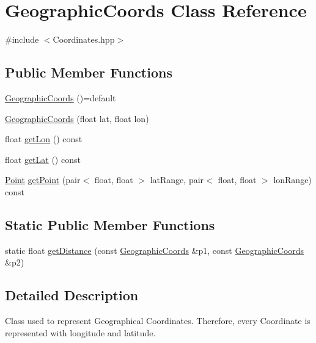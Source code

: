 \hypertarget{class_geographic_coords}{}\section{Geographic\+Coords Class Reference}
\label{class_geographic_coords}


{\ttfamily \#include $<$Coordinates.\+hpp$>$}

\subsection*{Public Member Functions}
\begin{DoxyCompactItemize}
\item 
\hyperlink{class_geographic_coords_a6e58da78d507551dc7a6c39e6ffb33b3}{Geographic\+Coords} ()=default
\item 
\hyperlink{class_geographic_coords_a5db8168e8754a1eb2d13e3d2c8318cb4}{Geographic\+Coords} (float lat, float lon)
\item 
float \hyperlink{class_geographic_coords_a4e59f2e3ea261e73c33014368770ad21}{get\+Lon} () const
\item 
float \hyperlink{class_geographic_coords_ab2fa1d7cde50be2a00c297caa302297a}{get\+Lat} () const
\item 
\hyperlink{class_point}{Point} \hyperlink{class_geographic_coords_aa333be28efcee6d8da24adabe5cd5594}{get\+Point} (pair$<$ float, float $>$ lat\+Range, pair$<$ float, float $>$ lon\+Range) const
\end{DoxyCompactItemize}
\subsection*{Static Public Member Functions}
\begin{DoxyCompactItemize}
\item 
static float \hyperlink{class_geographic_coords_a25f3ba7791c305b8620bb0ef8adac156}{get\+Distance} (const \hyperlink{class_geographic_coords}{Geographic\+Coords} \&p1, const \hyperlink{class_geographic_coords}{Geographic\+Coords} \&p2)
\end{DoxyCompactItemize}


\subsection{Detailed Description}
Class used to represent Geographical Coordinates. Therefore, every Coordinate is represented with longitude and latitude. 

